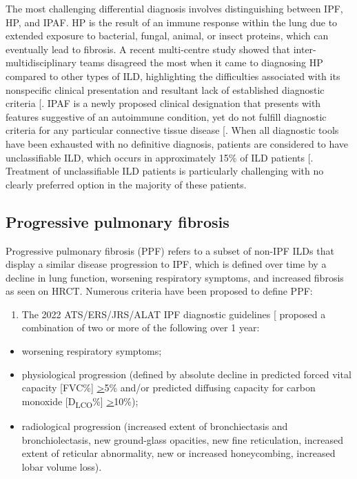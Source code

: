 \documentclass[
]{article}
\providecommand{\tightlist}{%
  \setlength{\itemsep}{0pt}\setlength{\parskip}{0pt}}
\begin{document}
The most challenging differential diagnosis involves distinguishing between IPF, HP, and IPAF. HP is the result of an immune response within the lung due to extended exposure to bacterial, fungal, animal, or insect proteins, which can eventually lead to fibrosis. A recent multi-centre study showed that inter-multidisciplinary teams disagreed the most when it came to diagnosing HP compared to other types of ILD, highlighting the difficulties associated with its nonspecific clinical presentation and resultant lack of established diagnostic criteria {[}\citeproc{ref-walsh_multicentre_2016}{16}{]}. IPAF is a newly proposed clinical designation that presents with features suggestive of an autoimmune condition, yet do not fulfill diagnostic criteria for any particular connective tissue disease {[}\citeproc{ref-graney_interstitial_2019}{17}{]}. When all diagnostic tools have been exhausted with no definitive diagnosis, patients are considered to have unclassifiable ILD, which occurs in approximately 15\% of ILD patients {[}\citeproc{ref-skolnik_unclassifiable_2016}{18}{]}. Treatment of unclassifiable ILD patients is particularly challenging with no clearly preferred option in the majority of these patients.

\subsection{Progressive pulmonary fibrosis}\label{ppf}

Progressive pulmonary fibrosis (PPF) refers to a subset of non-IPF ILDs that display a similar disease progression to IPF, which is defined over time by a decline in lung function, worsening respiratory symptoms, and increased fibrosis as seen on HRCT. Numerous criteria have been proposed to define PPF:

\begin{enumerate}
\def\labelenumi{\arabic{enumi}.}
\tightlist
\item
  The 2022 ATS/ERS/JRS/ALAT IPF diagnostic guidelines {[}\citeproc{ref-raghu_idiopathic_2022}{2}{]} proposed a combination of two or more of the following over 1 year:
\end{enumerate}

\begin{itemize}
\tightlist
\item
  worsening respiratory symptoms;
\item
  physiological progression (defined by absolute decline in predicted forced vital capacity {[}FVC\%{]} \underline{>}5\% and/or predicted diffusing capacity for carbon monoxide {[}D\textsubscript{LCO}\%{]} \underline{>}10\%);
\item
  radiological progression (increased extent of bronchiectasis and bronchiolectasis, new ground-glass opacities, new fine reticulation, increased extent of reticular abnormality, new or increased honeycombing, increased lobar volume loss).
\end{itemize}
\end{document}

